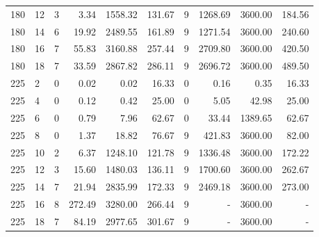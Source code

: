 \begin{appendices}
\begin{table*}[h]
\begin{center}
\begin{tabular} {l l | r r r r | r r r r}
180 & 12                            &  3                 &  3.34          &  1558.32    &  131.67      &  9          &  1268.69         &  3600.00    &  184.56    \\ 
180 & 14                            &  6                 &  19.92         &  2489.55    &  161.89      &  9          &  1271.54         &  3600.00    &  240.60    \\ 
180 & 16                            &  7                 &  55.83         &  3160.88    &  257.44      &  9          &  2709.80         &  3600.00    &  420.50    \\ 
180 & 18                            &  7                 &  33.59         &  2867.82    &  286.11      &  9          &  2696.72         &  3600.00    &  489.50    \\ 
225 & 2                             &  0                 &  0.02          &  0.02       &  16.33       &  0          &  0.16            &  0.35       &  16.33     \\ 
225 & 4                             &  0                 &  0.12          &  0.42       &  25.00       &  0          &  5.05            &  42.98      &  25.00     \\ 
225 & 6                             &  0                 &  0.79          &  7.96       &  62.67       &  0          &  33.44           &  1389.65    &  62.67     \\ 
225 & 8                             &  0                 &  1.37          &  18.82      &  76.67       &  9          &  421.83          &  3600.00    &  82.00     \\ 
225 & 10                            &  2                 &  6.37          &  1248.10    &  121.78      &  9          &  1336.48         &  3600.00    &  172.22    \\ 
225 & 12                            &  3                 &  15.60         &  1480.03    &  136.11      &  9          &  1700.60         &  3600.00    &  262.67    \\ 
225 & 14                            &  7                 &  21.94         &  2835.99    &  172.33      &  9          &  2469.18         &  3600.00    &  273.00    \\ 
225 & 16                            &  8                 &  272.49        &  3280.00    &  266.44      &  9          &  -               &  3600.00    &  -         \\ 
225 & 18                            &  7                 &  84.19         &  2977.65    &  301.67      &  9          &  -               &  3600.00    &  -         \\ 

\end{tabular}
\end{center}
\end{table*}
\end{appendices}
